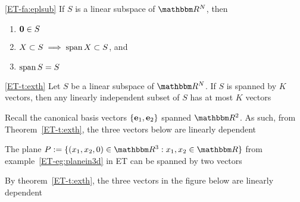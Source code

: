 \begin{frame}

    \vspace{.7em}
    \Fact\eqref{ET-fa:eplsub}
    If $S$ is a linear subspace of $\RR^N$, then
    \begin{enumerate}
        \item ${\mathbf 0} \in S$
        \item $X \subset S \implies \operatorname{span} X \subset S$, and
        \item $\operatorname{span} S = S$
    \end{enumerate}
    \vspace{2em}
    
    \Thm\eqref{ET-t:exth}
    Let $S$ be a linear subspace of $\RR^N$. If $S$ is spanned by $K$ vectors,
    then any linearly independent subset of $S$ has at most $K$
    vectors
    
\end{frame}

\begin{frame}

    \vspace{2em}
    \Eg
    Recall the canonical basis vectors
    $\{{\mathbf e}_1, {\mathbf e}_2\}$ spanned $\RR^2$. As such, from Theorem~\ref{ET-t:exth}, 
    the three vectors below are linearly dependent 
    \begin{figure}
       \begin{center}
       \end{center}
    \end{figure}
    
\end{frame}

\begin{frame}

    \vspace{2em}
    \Eg
    The plane
        $P := \setntn{(x_1, x_2, 0) \in \RR^3}{ x_1, x_2 \in \RR}$
    from example~\ref{ET-eg:planein3d} in ET can be
    spanned by two vectors
    
    By theorem~\ref{ET-t:exth}, the three vectors in the
    figure below are linearly dependent 
    \begin{figure}
       \begin{center}
       \end{center}
    \end{figure}

\end{frame}


